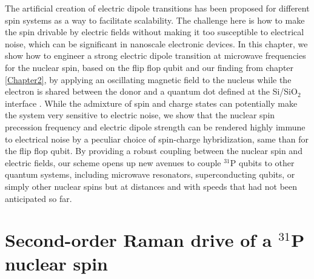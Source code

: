 The artificial creation of electric dipole transitions has been proposed for different spin systems \cite{Pioro-Ladriere2008,Shi2012,Russ2017,Salfi2016,Tosi2017} as a way to facilitate scalability. The challenge here is how to make the spin drivable by electric fields without making it too susceptible to electrical noise, which can be significant in nanoscale electronic devices. In this chapter, we show how to engineer a strong electric dipole transition at microwave frequencies for the nuclear spin, based on the flip flop qubit and our finding from chapter \ref{Chapter2}, by applying an oscillating magnetic field to the nucleus while the electron is shared between the donor and a quantum dot defined at the Si/SiO$_2$ interface \cite{Calderon2009,Veldhorst2014, Tosi2017,Harvey-Collard2017}. While the admixture of spin and charge states can potentially make the system very sensitive to electric noise, we show that the nuclear spin precession frequency and electric dipole strength can be rendered highly immune to electrical noise by a peculiar choice of spin-charge hybridization, same than for the flip flop qubit. By providing a robust coupling between the nuclear spin and electric fields, our scheme opens up new avenues to couple $^{31}$P qubits to other quantum systems, including microwave resonators, superconducting qubits, or simply other nuclear spins but at distances and with speeds that had not been anticipated so far.


\section{Second-order Raman drive of a $^{31}$P nuclear spin} \label{sec:Raman}


